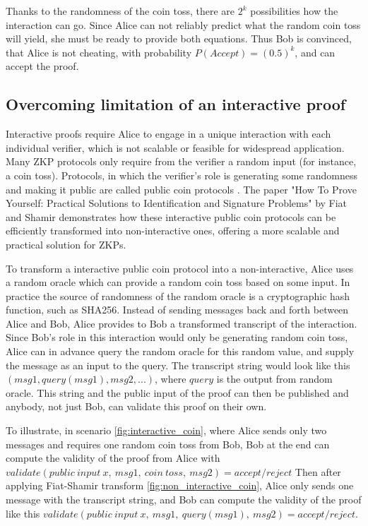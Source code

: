 \documentclass[conference,comsoc,10pt]{IEEEtran}
\begin{document}
        Thanks to the randomness of the coin toss, there are $2^k$ possibilities how
        the interaction can go. Since Alice can not reliably predict what the random
        coin toss will yield, she must be ready to provide both equations. Thus Bob is
        convinced, that Alice is not cheating, with probability $P(Accept) = (0.5)^k$,
        and can accept the proof.

    \subsection{Overcoming limitation of an interactive proof}
        Interactive proofs require Alice to engage in a unique interaction with
        each individual verifier, which is not scalable or feasible for widespread
        application. Many ZKP protocols only require from the verifier a random input
        (for instance, a coin toss). Protocols, in which the verifier's role is
        generating some randomness and making it public are called public coin
        protocols \cite{Babai1988,Goldwasser1986}. The paper "How To Prove
        Yourself: Practical Solutions to Identification and Signature Problems"
        \cite{Fiat} by Fiat and Shamir demonstrates how these interactive public
        coin protocols can be efficiently transformed into non-interactive ones,
        offering a more scalable and practical solution for ZKPs.

        To transform a interactive public coin protocol into a non-interactive,
        Alice uses a random oracle which can provide a random coin toss based on some
        input. In practice the source of randomness of the random oracle is a
        cryptographic hash function, such as SHA256. Instead of sending messages back
        and forth between Alice and Bob, Alice provides to Bob a transformed
        transcript of the interaction. Since Bob's role in this interaction would only
        be generating random coin toss, Alice can in advance query the random oracle
        for this random value, and supply the message as an input to the query. The
        transcript string would look like this $(msg1, query(msg1), msg2, ...)$, where $query$ is
        the output from random oracle. This string and the public input of the proof
        can then be published and anybody, not just Bob, can validate this proof
        on their own.

        To illustrate, in scenario \ref{fig:interactive_coin}, where Alice
        sends only two messages and requires one random coin toss from Bob,
        Bob at the end can compute the validity of the proof from Alice with
        $validate(public\:input\:x,\:msg1,\:coin\:toss,\:msg2) = accept/reject$
        Then after applying Fiat-Shamir transform \ref{fig:non_interactive_coin},
        Alice only sends one message with the transcript string, and Bob can
        compute the validity of the proof like this
        $validate(public\:input\:x,\:msg1,\:query(msg1),\:msg2) = accept/reject$.
\end{document}
